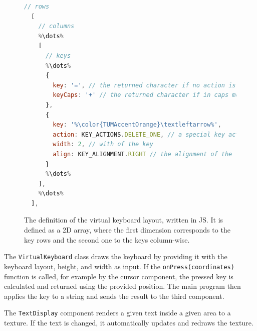 \begin{figure}[H]
	\begin{lstlisting}[language=JavaScript]
  // rows
  [
    // columns
    %\dots%
    [ 
      // keys
      %\dots%
      {
        key: '=', // the returned character if no action is present otherwise just a label
        keyCaps: '+' // the returned character if in caps mode 
      },
      {
        key: '%\color{TUMAccentOrange}\textleftarrow%',
        action: KEY_ACTIONS.DELETE_ONE, // a special key action; in this case, it deletes the last character
        width: 2, // with of the key
        align: KEY_ALIGNMENT.RIGHT // the alignment of the label on the key
      }
      %\dots%
    ],
    %\dots%
  ],
  \end{lstlisting}
	\caption[Virtual keyboard layout definition]{The definition of the virtual keyboard layout, written in \ac{JS}. It is defined as a \ac{2D} array, where the first dimension corresponds to the key rows and the second one to the keys column-wise.}\label{fig:virtual-keyboard-layout}
\end{figure}

The \lstinline{VirtualKeyboard} class draws the keyboard by providing it with the keyboard layout, height, and width as input. If the \lstinline{onPress(coordinates)} function is called, for example by the cursor component, the pressed key is calculated and returned using the provided position. The main program then applies the key to a string and sends the result to the third component. %

The \lstinline{TextDisplay} component renders a given text inside a given area to a texture. If the text is changed, it automatically updates and redraws the texture.